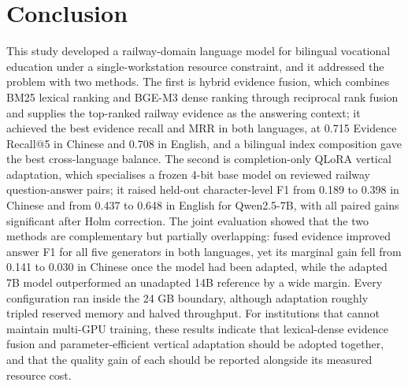 \documentclass{article}
\begin{document}
\section{Conclusion}

This study developed a railway-domain language model for bilingual vocational education under a single-workstation resource constraint, and it addressed the problem with two methods. The first is hybrid evidence fusion, which combines BM25 lexical ranking and BGE-M3 dense ranking through reciprocal rank fusion and supplies the top-ranked railway evidence as the answering context; it achieved the best evidence recall and MRR in both languages, at 0.715 Evidence Recall@5 in Chinese and 0.708 in English, and a bilingual index composition gave the best cross-language balance. The second is completion-only QLoRA vertical adaptation, which specialises a frozen 4-bit base model on reviewed railway question-answer pairs; it raised held-out character-level F1 from 0.189 to 0.398 in Chinese and from 0.437 to 0.648 in English for Qwen2.5-7B, with all paired gains significant after Holm correction. The joint evaluation showed that the two methods are complementary but partially overlapping: fused evidence improved answer F1 for all five generators in both languages, yet its marginal gain fell from 0.141 to 0.030 in Chinese once the model had been adapted, while the adapted 7B model outperformed an unadapted 14B reference by a wide margin. Every configuration ran inside the 24 GB boundary, although adaptation roughly tripled reserved memory and halved throughput. For institutions that cannot maintain multi-GPU training, these results indicate that lexical-dense evidence fusion and parameter-efficient vertical adaptation should be adopted together, and that the quality gain of each should be reported alongside its measured resource cost.
\end{document}
